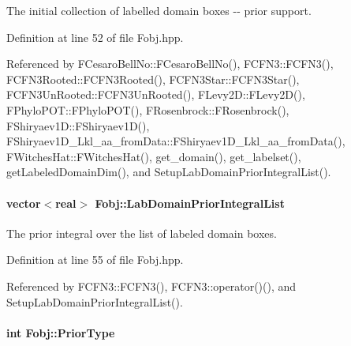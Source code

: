 \-The initial collection of labelled domain boxes -\/-\/ prior support. 



\-Definition at line 52 of file \-Fobj.\-hpp.



\-Referenced by \-F\-Cesaro\-Bell\-No\-::\-F\-Cesaro\-Bell\-No(), \-F\-C\-F\-N3\-::\-F\-C\-F\-N3(), \-F\-C\-F\-N3\-Rooted\-::\-F\-C\-F\-N3\-Rooted(), \-F\-C\-F\-N3\-Star\-::\-F\-C\-F\-N3\-Star(), \-F\-C\-F\-N3\-Un\-Rooted\-::\-F\-C\-F\-N3\-Un\-Rooted(), \-F\-Levy2\-D\-::\-F\-Levy2\-D(), \-F\-Phylo\-P\-O\-T\-::\-F\-Phylo\-P\-O\-T(), \-F\-Rosenbrock\-::\-F\-Rosenbrock(), \-F\-Shiryaev1\-D\-::\-F\-Shiryaev1\-D(), \-F\-Shiryaev1\-D\-\_\-\-Lkl\-\_\-aa\-\_\-from\-Data\-::\-F\-Shiryaev1\-D\-\_\-\-Lkl\-\_\-aa\-\_\-from\-Data(), \-F\-Witches\-Hat\-::\-F\-Witches\-Hat(), get\-\_\-domain(), get\-\_\-labelset(), get\-Labeled\-Domain\-Dim(), and \-Setup\-Lab\-Domain\-Prior\-Integral\-List().

\hypertarget{classFobj_aacc4fb1fe699ad34bd51eea955220d72}{
\paragraph[{\-Lab\-Domain\-Prior\-Integral\-List}]{\setlength{\rightskip}{0pt plus 5cm}vector$<$real$>$ {\bf \-Fobj\-::\-Lab\-Domain\-Prior\-Integral\-List}}}\label{classFobj_aacc4fb1fe699ad34bd51eea955220d72}


\-The prior integral over the list of labeled domain boxes. 



\-Definition at line 55 of file \-Fobj.\-hpp.



\-Referenced by \-F\-C\-F\-N3\-::\-F\-C\-F\-N3(), \-F\-C\-F\-N3\-::operator()(), and \-Setup\-Lab\-Domain\-Prior\-Integral\-List().

\hypertarget{classFobj_aa58fc4a0d73e6ece446db9a87a633820}{
\paragraph[{\-Prior\-Type}]{\setlength{\rightskip}{0pt plus 5cm}int {\bf \-Fobj\-::\-Prior\-Type}}}\label{classFobj_aa58fc4a0d73e6ece446db9a87a633820}


